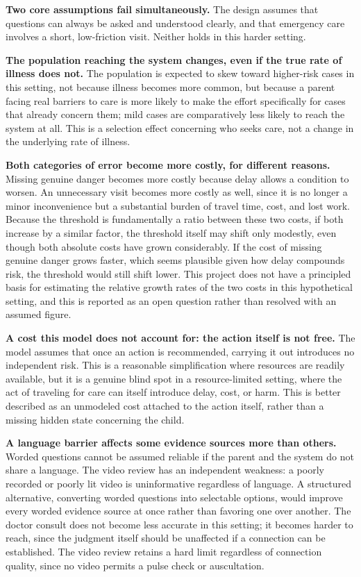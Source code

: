 \documentclass{article}
\begin{document}
\textbf{Two core assumptions fail simultaneously.} The design assumes
that questions can always be asked and understood clearly, and that
emergency care involves a short, low-friction visit. Neither holds in
this harder setting.

\textbf{The population reaching the system changes, even if the true
rate of illness does not.} The population is expected to skew toward
higher-risk cases in this setting, not because illness becomes more
common, but because a parent facing real barriers to care is more likely
to make the effort specifically for cases that already concern them;
mild cases are comparatively less likely to reach the system at all.
This is a selection effect concerning who seeks care, not a change in
the underlying rate of illness.

\textbf{Both categories of error become more costly, for different
reasons.} Missing genuine danger becomes more costly because delay
allows a condition to worsen. An unnecessary visit becomes more costly
as well, since it is no longer a minor inconvenience but a substantial
burden of travel time, cost, and lost work. Because the threshold is
fundamentally a ratio between these two costs, if both increase by a
similar factor, the threshold itself may shift only modestly, even
though both absolute costs have grown considerably. If the cost of
missing genuine danger grows faster, which seems plausible given how
delay compounds risk, the threshold would still shift lower. This
project does not have a principled basis for estimating the relative
growth rates of the two costs in this hypothetical setting, and this is
reported as an open question rather than resolved with an assumed
figure.

\textbf{A cost this model does not account for: the action itself is not
free.} The model assumes that once an action is recommended, carrying it
out introduces no independent risk. This is a reasonable simplification
where resources are readily available, but it is a genuine blind spot in
a resource-limited setting, where the act of traveling for care can
itself introduce delay, cost, or harm. This is better described as an
unmodeled cost attached to the action itself, rather than a missing
hidden state concerning the child.

\textbf{A language barrier affects some evidence sources more than
others.} Worded questions cannot be assumed reliable if the parent and
the system do not share a language. The video review has an independent
weakness: a poorly recorded or poorly lit video is uninformative
regardless of language. A structured alternative, converting worded
questions into selectable options, would improve every worded evidence
source at once rather than favoring one over another. The doctor consult
does not become less accurate in this setting; it becomes harder to
reach, since the judgment itself should be unaffected if a connection
can be established. The video review retains a hard limit regardless of
connection quality, since no video permits a pulse check or
auscultation.
\end{document}
